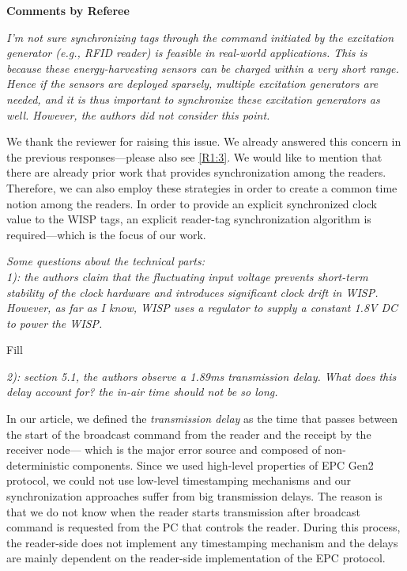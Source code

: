 \documentclass[10pt]{article}
\newcommand{\referee}[1]{
	{\item \color{OliveGreen} \emph{{#1}}}
	\label{R\therefereeCounter:\arabic{enumi}}
}
\newcommand{\response}[1]{{\color{blue} #1}}
\newcounter{refereeCounter}
\newenvironment{responses}{%
\refstepcounter{refereeCounter}%
\textbf{\large Comments by Referee \therefereeCounter}
\begin{enumerate}%
\renewcommand{\labelenumi}{\textbf{[R\therefereeCounter :\,\arabic{enumi}]}} %
}{\end{enumerate}}
\begin{document}
\begin{responses}
\referee{I’m not sure synchronizing tags through the command initiated by the 
excitation generator (e.g., RFID reader) is feasible in real-world applications. This is because these energy-harvesting sensors can be charged within a very short range. Hence if the sensors are deployed sparsely, multiple excitation generators are needed, and it is thus important to synchronize these excitation generators as well. However, the authors did not consider this point.
}
	
\response{
We thank the reviewer for raising this issue. We already answered this concern in the previous responses---please also see \hyperref[R1:3]{[R1:3]}. We would like to mention that there are already prior work that provides synchronization among the readers. Therefore, we can also employ these strategies in order to create a common time notion among the readers. In order to provide an explicit synchronized clock value to the WISP tags, an explicit reader-tag synchronization algorithm is required---which is the focus of our work.
}
	
\referee{Some questions about the technical parts: \\
1): the authors claim that the fluctuating input voltage prevents short-term stability of the clock hardware and introduces significant clock drift in WISP. However, as far as I know, WISP uses a regulator to supply a constant 1.8V DC to power the WISP.}
	
\response{
	Fill
}
	
\referee{2): section 5.1, the authors observe a 1.89ms transmission delay. What does this delay account for? the in-air time should not be so long.
}
	
\response{
In our article, we defined the \emph{transmission delay} as the time that passes between the start of the broadcast command from the reader and the receipt by the receiver node--- which is the major error source and composed of non-deterministic components. Since we used high-level properties of EPC Gen2 protocol, we could not use low-level timestamping mechanisms and our synchronization approaches suffer from big transmission delays.  The reason is that we do not know when the reader starts transmission after broadcast command is requested from the PC that controls the reader. During this process, the reader-side does not implement any timestamping mechanism and the delays are mainly dependent on the reader-side implementation of the EPC protocol.   
}
	
\end{responses}
\end{document}
